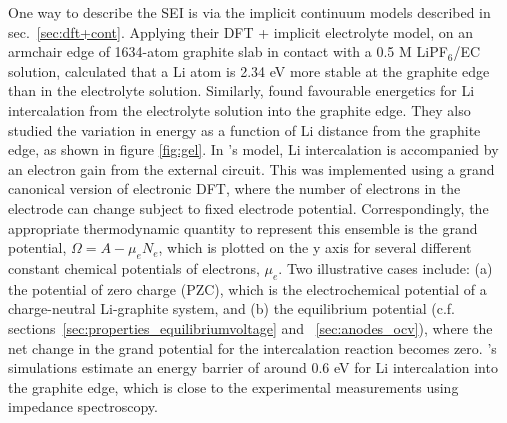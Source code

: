 \documentclass[../main.tex]{subfiles}
\begin{document}
One way to describe the SEI is via the implicit continuum models described in sec.~\ref{sec:dft+cont}. Applying their DFT + implicit electrolyte model, on an armchair edge of 1634-atom graphite slab in contact with a 0.5 M LiPF$_6$/EC solution, \citeauthor{Dziedzic2020} calculated that a Li atom is 2.34 eV more stable at the graphite edge than in the electrolyte solution.\cite{Dziedzic2020} Similarly, \citeauthor{haruyama2018} found favourable energetics for Li intercalation from the electrolyte solution into the graphite edge.\cite{haruyama2018} They also studied the variation in energy as a function of Li distance from the graphite edge, as shown in figure \ref{fig:gel}. In \citeauthor{haruyama2018}'s model, Li intercalation is accompanied by an electron gain from the external circuit. This was implemented using a grand canonical version of electronic DFT, where the number of electrons in the electrode can change subject to fixed electrode potential. Correspondingly, the appropriate thermodynamic quantity to represent this ensemble is the grand potential, $\Omega=A-\mu_e N_e$, which is plotted on the y axis for several different constant chemical potentials of electrons, $\mu_e$. Two illustrative cases include: (a) the potential of zero charge (PZC), which is the electrochemical potential of a charge-neutral Li-graphite system, and (b) the equilibrium potential (c.f.  sections~\ref{sec:properties_equilibriumvoltage} and ~\ref{sec:anodes_ocv}), where the net change in the grand potential for the intercalation reaction becomes zero. \citeauthor{haruyama2018}'s simulations estimate an energy barrier of around 0.6 eV for Li intercalation into the graphite edge, which is close to the experimental measurements using impedance spectroscopy.\cite{Yamada2009}
\end{document}
